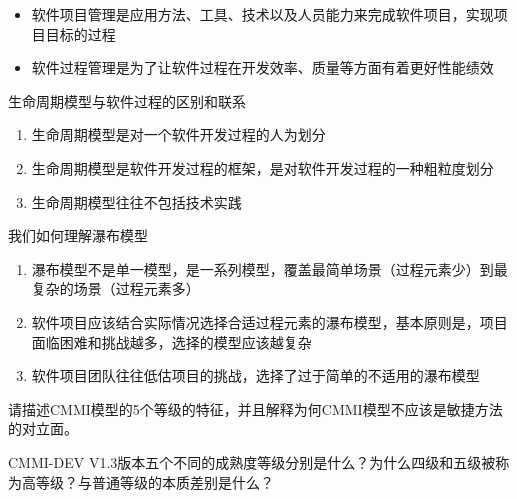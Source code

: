 \begin{solution}
\begin{itemize}
    \item 软件项目管理是应用方法、工具、技术以及人员能力来完成软件项目，实现项目目标的过程
    \item 软件过程管理是为了让软件过程在开发效率、质量等方面有着更好性能绩效
\end{itemize}
\end{solution}



\begin{problem}[2018、2020]
生命周期模型与软件过程的区别和联系
\end{problem}

\begin{solution}
\begin{enumerate}[label=\arabic*.]
    \item 生命周期模型是对一个软件开发过程的人为划分
    \item 生命周期模型是软件开发过程的框架，是对软件开发过程的一种粗粒度划分
    \item 生命周期模型往往不包括技术实践
\end{enumerate}
\end{solution}


\begin{problem}[2020]
我们如何理解瀑布模型
\end{problem}

\begin{solution}
\begin{enumerate}[label=\arabic*.]
    \item 瀑布模型不是单一模型，是一系列模型，覆盖最简单场景（过程元素少）到最复杂的场景（过程元素多）
    \item 软件项目应该结合实际情况选择合适过程元素的瀑布模型，基本原则是，项目面临困难和挑战越多，选择的模型应该越复杂
    \item 软件项目团队往往低估项目的挑战，选择了过于简单的不适用的瀑布模型
\end{enumerate} 
\end{solution}



\begin{problem}[2020、2023]
请描述CMMI模型的5个等级的特征，并且解释为何CMMI模型不应该是敏捷方法的对立面。

CMMI-DEV V1.3版本五个不同的成熟度等级分别是什么？为什么四级和五级被称为高等级？与普通等级的本质差别是什么？
\end{problem}

